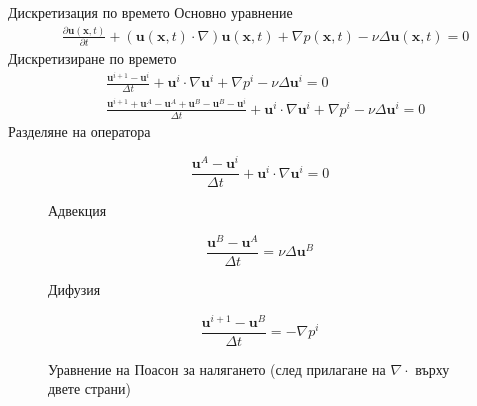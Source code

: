 \documentclass{beamer}
\newcommand{\vecf}[1]{\textbf{#1}}
\begin{document}
    \begin{frame}{Дискретизация по времето}
    		\small
    		Основно уравнение
    		\begin{align*}
    			&\frac{\partial \vecf{u}(\vecf{x}, t)}{\partial t} + \left(\vecf{u}(\vecf{x}, t)\cdot\nabla\right)\vecf{u}(\vecf{x}, t) + \nabla p(\vecf{x}, t) - \nu\Delta\vecf{u}(\vecf{x}, t) = 0
    		\end{align*}
    		Дискретизиране по времето
    		\begin{align*}
			&\frac{\vecf{u}^{i+1} - \vecf{u}^{i}}{\Delta t} + \vecf{u}^i \cdot \nabla\vecf{u}^i + \nabla p^i - \nu \Delta \vecf{u}^i = 0 \\
			&\frac{\vecf{u}^{i+1} + \vecf{u}^A - \vecf{u}^A + \vecf{u}^B - \vecf{u}^B - \vecf{u}^{i}}{\Delta t} + \vecf{u}^i \cdot \nabla\vecf{u}^i + \nabla p^i - \nu \Delta \vecf{u}^i = 0
		\end{align*}
	Разделяне на оператора
\begin{figure}
\setlength{\belowdisplayskip}{0.5em} \setlength{\belowdisplayshortskip}{0.1em}
\setlength{\abovedisplayskip}{0.5em} \setlength{\abovedisplayshortskip}{0.1em}
  \begin{minipage}[c]{0.3\textwidth}
    $$\frac{\vecf{u}^A - \vecf{u}^i}{\Delta t} + \vecf{u}^i \cdot \nabla\vecf{u}^i = 0$$
  \end{minipage}\hfill
  \begin{minipage}[c]{0.67\textwidth}
  	\captionsetup{labelformat=empty}
    \caption{Адвекция} 
  \end{minipage}
  
    \begin{minipage}[c]{0.3\textwidth}
    $$\frac{\vecf{u}^B - \vecf{u}^A}{\Delta t} =\nu \Delta \vecf{u}^B$$
  \end{minipage}\hfill
  \begin{minipage}[c]{0.67\textwidth}
  	\captionsetup{labelformat=empty}
    \caption{Дифузия} 
  \end{minipage}
  \begin{minipage}[c]{0.3\textwidth}
    $$\frac{\vecf{u}^{i+1} - \vecf{u}^B}{\Delta t} = -\nabla p^i$$
  \end{minipage}\hfill
  \begin{minipage}[c]{0.67\textwidth}
  	\captionsetup{labelformat=empty}
    \caption{Уравнение на Поасон за налягането (след прилагане на $\nabla \cdot$ върху двете страни)} 
  \end{minipage}
\end{figure}
    \end{frame}
    
\end{document}

